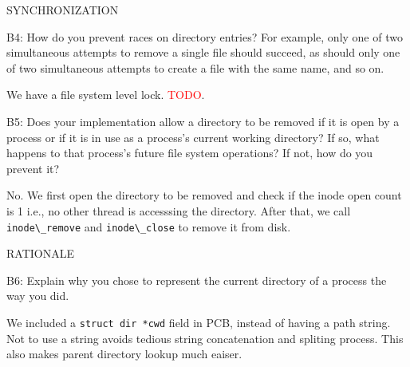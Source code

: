 \begin{aspect}{SYNCHRONIZATION}
	\begin{qc}
		B4: How do you prevent races on directory entries?  For example,
		only one of two simultaneous attempts to remove a single file
		should succeed, as should only one of two simultaneous attempts to
		create a file with the same name, and so on.
	\end{qc}
	We have a file system level lock.
	\textcolor{red}{TODO}.

	\begin{qc}
		B5: Does your implementation allow a directory to be removed if it
		is open by a process or if it is in use as a process's current working directory?
		If so, what happens to that process's future file system operations?
		If not, how do you prevent it?
	\end{qc}
	No.
	We first open the directory to be removed and check if the inode open count is 1 i.e., no other thread is accesssing the directory.
	After that, we call \lstinline{inode\_remove} and \lstinline{inode\_close} to remove it from disk.
\end{aspect}


\begin{aspect}{RATIONALE}
	\begin{qc}
		B6: Explain why you chose to represent the current directory of a
		process the way you did.
	\end{qc}
	We included a \lstinline{struct dir *cwd} field in PCB, instead of having a path string.\\
	Not to use a string avoids tedious string concatenation and spliting process.
	This also makes parent directory lookup much eaiser.
\end{aspect}
